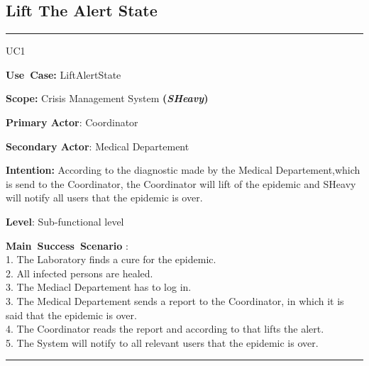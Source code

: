 \subsection{Lift The Alert State}
\vspace{0.5cm}
\hrule
\vspace{0.5cm}
\begin{lyxlist}{UC1}
\small{
\item [\textbf{Use~Case:}] LiftAlertState
\item [\textbf{Scope:}] Crisis Management System \textbf{(\emph{SHeavy})}
\item [\textbf{Primary Actor}:] Coordinator
\item [\textbf{Secondary Actor}:] Medical Departement
\item [\textbf{Intention:}] According to the diagnostic made by the Medical
Departement,which is send to the Coordinator, the Coordinator
will lift of the epidemic and SHeavy will notify all users that the epidemic is
over.
\item [\textbf{Level}:]Sub-functional level
\item [\textbf{Main~Success~Scenario}]:\\
1. The Laboratory finds a cure for the epidemic.\\
2. All infected persons are healed.\\
3. The Mediacl Departement has to log in.\\
3. The Medical Departement sends a report to the Coordinator, in which it is
said that the epidemic is over.\\
4. The Coordinator reads the report and according to that lifts the alert.\\ 
5. The System will notify to all relevant users that the epidemic is over.\\
}
\end{lyxlist}
\hrule
\vspace{0.5cm} 

